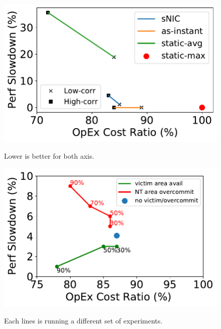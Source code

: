 {
\begin{figure}[th]
\begin{minipage}{\figWidthSix}
\begin{center}
\centerline{\includegraphics[width=\columnwidth]{Figures/fig-conslid-overview-new.pdf}}
\vspace{-0.1in}
{
Lower is better for both axis.
}
\end{center}
\end{minipage}
\begin{minipage}{\figWidthSix}
\begin{center}
\centerline{\includegraphics[width=\columnwidth]{Figures/fig-single-snic-low-corr.pdf}}
\vspace{-0.1in}
{
Each lines is running a different set of experiments.
}
\end{center}

\end{minipage}
\end{figure}}

